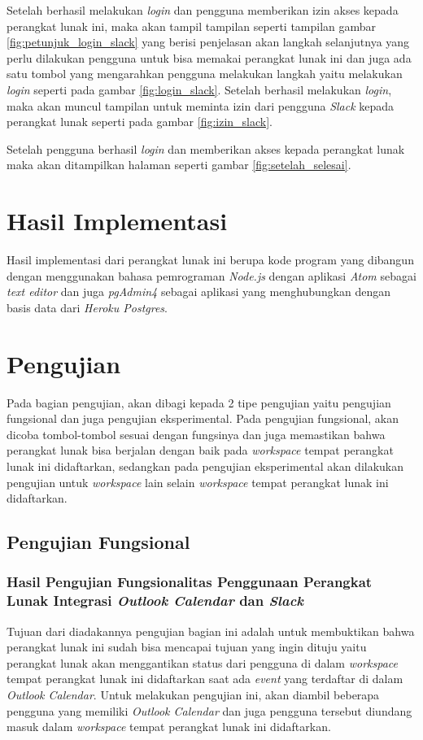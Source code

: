 Setelah berhasil melakukan \textit{login} dan pengguna memberikan izin akses kepada perangkat lunak ini, maka akan tampil tampilan seperti tampilan gambar \ref{fig:petunjuk_login_slack} yang berisi penjelasan akan langkah selanjutnya yang perlu dilakukan pengguna untuk bisa memakai perangkat lunak ini dan juga ada satu tombol yang mengarahkan pengguna melakukan langkah yaitu melakukan \textit{login} seperti pada gambar \ref{fig:login_slack}. Setelah berhasil melakukan \textit{login}, maka akan muncul tampilan untuk meminta izin dari pengguna \textit{Slack} kepada perangkat lunak seperti pada gambar \ref{fig:izin_slack}. 

Setelah pengguna berhasil \textit{login} dan memberikan akses kepada perangkat lunak maka akan ditampilkan halaman seperti gambar \ref{fig:setelah_selesai}. 

\section{Hasil Implementasi}
Hasil implementasi dari perangkat lunak ini berupa kode program yang dibangun dengan menggunakan bahasa pemrograman \textit{Node.js} dengan aplikasi \textit{Atom} sebagai \textit{text editor} dan juga \textit{pgAdmin4} sebagai aplikasi yang menghubungkan dengan basis data dari \textit{Heroku Postgres}.  

\section{Pengujian}
Pada bagian pengujian, akan dibagi kepada 2 tipe pengujian yaitu pengujian fungsional dan juga pengujian eksperimental. Pada pengujian fungsional, akan dicoba tombol-tombol sesuai dengan fungsinya dan juga memastikan bahwa perangkat lunak bisa berjalan dengan baik pada \textit{workspace} tempat perangkat lunak ini didaftarkan, sedangkan pada pengujian eksperimental akan dilakukan pengujian untuk \textit{workspace} lain selain \textit{workspace} tempat perangkat lunak ini didaftarkan. 

\subsection{Pengujian Fungsional}
\subsubsection{Hasil Pengujian Fungsionalitas Penggunaan Perangkat Lunak Integrasi \textit{Outlook Calendar} dan \textit{Slack}}
Tujuan dari diadakannya pengujian bagian ini adalah untuk membuktikan bahwa perangkat lunak ini sudah bisa mencapai tujuan yang ingin dituju yaitu perangkat lunak akan menggantikan status dari pengguna di dalam \textit{workspace} tempat perangkat lunak ini didaftarkan saat ada \textit{event} yang terdaftar di dalam \textit{Outlook Calendar}. Untuk melakukan pengujian ini, akan diambil beberapa pengguna yang memiliki \textit{Outlook Calendar} dan juga pengguna tersebut diundang masuk dalam \textit{workspace} tempat perangkat lunak ini didaftarkan.

